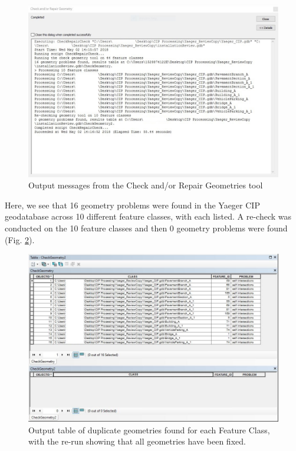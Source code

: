 \documentclass[openany]{book}
\theoremstyle{definition}
\theoremstyle{definition}
\theoremstyle{definition}
\theoremstyle{remark}
\begin{document}
\begin{figure}[H]

{\centering \includegraphics[width=5.07in,]{figures/chkG-messages} 

}

\caption{Output messages from the Check and/or Repair Geometries tool}\label{fig:chkGmessages}
\end{figure}

Here, we see that 16 geometry problems were found in the Yaeger CIP
geodatabase across 10 different feature classes, with each listed. A
re-check was conducted on the 10 feature classes and then 0 geometry
problems were found (Fig. \ref{fig:chkGafter}).

\begin{figure}[H]

{\centering \includegraphics[width=4.76in,]{figures/chkG-after} 

}

\caption{Output table of duplicate geometries found for each Feature Class, with the re-run showing that all geometries have been fixed.}\label{fig:chkGafter}
\end{figure}
\end{document}
